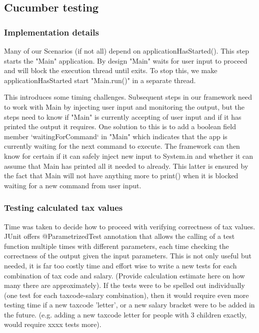 \subsection{Cucumber testing}




\subsubsection{Implementation details}


Many of our Scenarios (if not all) depend on applicationHasStarted(). This step starts the "Main" application. By design "Main" waits for user input to proceed and will block the execution thread until exits. To stop this, we make applicationHasStarted start "Main.run()" in a separate thread. 

This introduces some timing challenges. Subsequent steps in our framework need to work with Main by injecting user input and monitoring the output, but the steps need to know if "Main" is currently accepting of user input and if it has printed the output it requires. 
One solution to this is to add a boolean field member `waitingForCommand` in "Main" which indicates that the app is currently waiting for the next command to execute. The framework can then know for certain if it can safely inject new input to System.in and whether it can assume that Main has printed all it needed to already. This latter is ensured by the fact that Main will not have anything more to print() when it is blocked waiting for a new command from user input. 

\subsubsection{Testing calculated tax values}

Time was taken to decide how to proceed with verifying correctness of tax values. JUnit offers @ParametrizedTest annotation that allows the calling of a test function multiple times with different parameters, each time checking the correctness of the output given the input parameters. This is not only useful but needed, it is far too costly time and effort wise to write a new tests for each combination of tax code and salary. (Provide calculation estimate here on how many there are approximately).
If the tests were to be spelled out individually (one test for each taxcode-salary combination), then it would require even more testing time if a new taxcode 'letter', or a new salary bracket were to be added in the future. (e.g. adding a new taxcode letter for people with 3 children exactly, would require xxxx tests more). 

